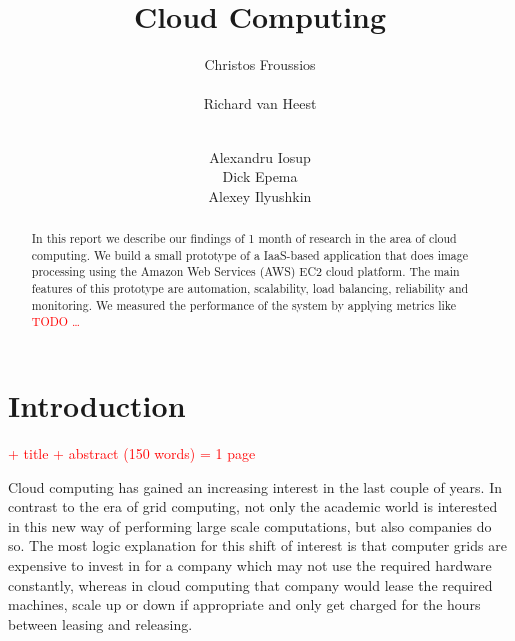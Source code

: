 \documentclass{stylesheet}
\begin{document}
\title{Cloud Computing}

\author{
\alignauthor
Christos Froussios\\
	\\
\alignauthor
Richard van Heest\\
	\\
\and
\alignauthor
Alexandru Iosup\\
\alignauthor
Dick Epema\\
\alignauthor
Alexey Ilyushkin\\
}

\maketitle

\begin{abstract}
In this report we describe our findings of 1 month of research in the area of cloud computing. We build a small prototype of a IaaS-based application that does image processing using the Amazon Web Services (AWS) EC2 cloud platform. The main features of this prototype are automation, scalability, load balancing, reliability and monitoring. We measured the performance of the system by applying metrics like \textcolor{red}{TODO \ldots}
\end{abstract}

\section{Introduction}
\textcolor{red}{+ title + abstract (150 words) = 1 page}

Cloud computing has gained an increasing interest in the last couple of years. In contrast to the era of grid computing, not only the academic world is interested in this new way of performing large scale computations, but also companies do so. The most logic explanation for this shift of interest is that computer grids are expensive to invest in for a company which may not use the required hardware constantly, whereas in cloud computing that company would lease the required machines, scale up or down if appropriate and only get charged for the hours between leasing and releasing.
\end{document}
